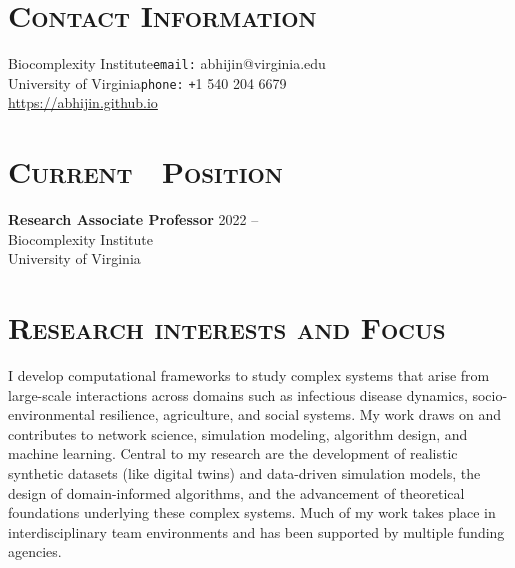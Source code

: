 \documentclass[margin,10pt]{res} %
\begin{document}
\begin{resume}

\section{\textnormal{\textsc{Contact Information}}}
Biocomplexity Institute\hfill \texttt{email:}
abhijin@virginia.edu\hspace{0mm}\mbox{}\\
University of Virginia\hfill \texttt{phone:}
\texttt{+}1 540 204 6679\hspace{6.5mm}\mbox{}\\
\url{https://abhijin.github.io}
\section{\textnormal{\textsc{Current\,\,\,\, Position}}}
\textbf{Research Associate Professor} \hfill 2022 -- \\
Biocomplexity Institute\\
University of Virginia
\section{\textnormal{\textsc{Research interests and Focus}}}
I develop computational frameworks to study complex systems that arise from
large-scale interactions across domains such as infectious disease
dynamics, socio-environmental resilience, agriculture, and social systems.
My work draws on and contributes to network science, simulation modeling,
algorithm design, and machine learning. Central to my research are the
development of realistic synthetic datasets (like digital twins) and
data-driven simulation models, the design of domain-informed algorithms,
and the advancement of theoretical foundations underlying these complex
systems. Much of my work takes place in interdisciplinary team environments
and has been supported by multiple funding agencies.\\


\end{resume}
\end{document}
